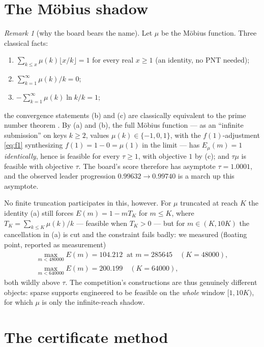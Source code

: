 \documentclass[11pt]{article}
\theoremstyle{remark}
\newtheorem{remark}[theorem]{Remark}
\begin{document}
\section{The M\"obius shadow}\label{sec:mobius}

\begin{remark}[why the board bears the name]\label{rem:mobius}
Let $\mu$ be the M\"obius function. Three classical facts:
\begin{enumerate}
\item[(a)] $\sum_{k \le x} \mu(k) \lfloor x/k \rfloor = 1$ for every real
$x \ge 1$ \cite[Theorem 3.12]{Apostol76} (an identity, no PNT needed);
\item[(b)] $\sum_{k=1}^{\infty} \mu(k)/k = 0$;
\item[(c)] $-\sum_{k=1}^{\infty} \mu(k) \ln k / k = 1$;
\end{enumerate}
the convergence statements (b) and (c) are classically equivalent to the
prime number theorem \cite[Ch.~4]{Apostol76}. By (a) and (b), the full
M\"obius function --- as an ``infinite submission'' on keys $k \ge 2$,
values $\mu(k) \in \{-1,0,1\}$, with the $f(1)$-adjustment
\eqref{eq:f1} synthesizing $f(1) = 1 - 0 = \mu(1)$ in the limit --- has
$E_\mu(m) = 1$ \emph{identically}, hence is feasible for every $\tau \ge
1$, with objective $1$ by (c); and $\tau\mu$ is feasible with objective
$\tau$. The board's score therefore has asymptote $\tau = 1.0001$, and the
observed leader progression $0.99632 \to 0.99740$ is a march up this
asymptote.

No finite truncation participates in this, however. For
$\mu$ truncated at reach $K$ the identity (a) still forces
$E(m) = 1 - m T_K$ for $m \le K$, where $T_K = \sum_{k \le K} \mu(k)/k$
--- feasible when $T_K > 0$ --- but for $m \in (K, 10K)$ the cancellation
in (a) is cut and the constraint fails badly: we measured (floating point,
reported as measurement)
\begin{gather*}
\max_{m < 480000} E(m) = 104.212 \;\;\text{at } m = 285645
\quad (K = 48000),\\[1pt]
\max_{m < 640000} E(m) = 200.199 \quad (K = 64000),
\end{gather*}
both wildly above $\tau$. The competition's constructions are thus
genuinely different objects: sparse supports engineered to be feasible on
the \emph{whole} window $[1, 10K)$, for which $\mu$ is only the
infinite-reach shadow.
\end{remark}

\section{The certificate method}\label{sec:method}
\end{document}
